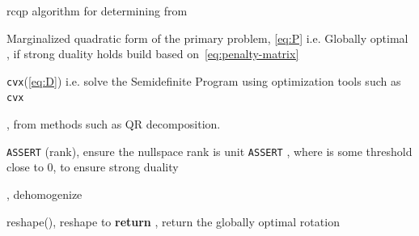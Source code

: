 \begin{algorithm}
	\algrenewcommand{}
	\algrenewcommand{}
	\caption{\gls{rcqp} algorithm for determining \tf[R]{\star}{} from }
	\label{alg:rcqp}
	\begin{algorithmic}[1]
		\Require Marginalized quadratic form of the primary problem, \ref{eq:P} i.e. 
		\Ensure Globally optimal \tf[R]{\star}{}, if strong duality holds
		\State {} build based on~\ref{eq:penalty-matrix}

		\State {} \texttt{cvx}(\ref{eq:D}) i.e. solve the Semidefinite Program using optimization tools such as \texttt{cvx} 

		\State {}, from methods such as QR decomposition.

		\State \texttt{ASSERT} (rank), ensure the nullspace rank is unit
		\State \texttt{ASSERT}   , where \mvar{\epsilon} is some threshold close to \num{0}, to ensure strong duality
		
		\State {}, dehomogenize 

		\State \mvar{\tf[R]{\star}{} \gets} reshape(), reshape  to 
		\State \textbf{return} \tf[R]{\star}{}, return the globally optimal rotation
	\end{algorithmic}
\end{algorithm}

